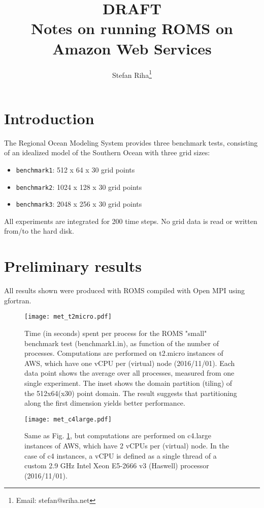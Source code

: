 \documentclass[12pt,a4paper]{article}
\title{
	{\bf DRAFT}\\
	Notes on running ROMS on Amazon Web Services 
}
\author{Stefan Riha\thanks{Email: stefan@sriha.net}}
\begin{document}
	\setlength{\parindent}{0cm}
	\maketitle
	
\section{Introduction}

The Regional Ocean Modeling System \citep[ROMS, see ][]{shchepetkin2005regional} provides three benchmark tests, consisting of 
an idealized model of the Southern Ocean with three grid sizes:

\begin{itemize}
	\item \verb|benchmark1|:   512 x 64 x 30 grid points
	\item \verb|benchmark2|:   1024 x 128 x 30 grid points
	\item \verb|benchmark3|:   2048 x 256 x 30 grid points
\end{itemize}

All experiments are integrated for 200 time steps. No grid data is read or written from/to the hard disk.

\section{Preliminary results}
	All results shown were produced with ROMS compiled with Open MPI using gfortran.
	
	\begin{figure}[H]
		\centering
		\texttt{[image: met\_t2micro.pdf]}
		\caption{Time (in seconds) spent per process for the ROMS "small" benchmark test (benchmark1.in), as function of the number of processes. Computations are performed on t2.micro instances of AWS, which have one vCPU per (virtual) node (2016/11/01). Each data point shows the average over all processes, measured from one single experiment. The inset shows the domain partition (tiling) of the 512x64(x30) point domain. The result suggests that partitioning along the first dimension yields better performance.}
		\label{fig:met_t2micro}
	\end{figure}

	\begin{figure}[H]
	\centering
	\texttt{[image: met\_c4large.pdf]}
	\caption{Same as Fig. \ref{fig:met_t2micro}, but computations are performed on c4.large instances of AWS, which have 2 vCPUs per (virtual) node. In the case of c4 instances, a vCPU is defined as a single thread of a custom 2.9 GHz Intel Xeon E5-2666 v3 (Haswell) processor (2016/11/01).}
	\label{fig:met_c4large}
\end{figure}
\end{document}
